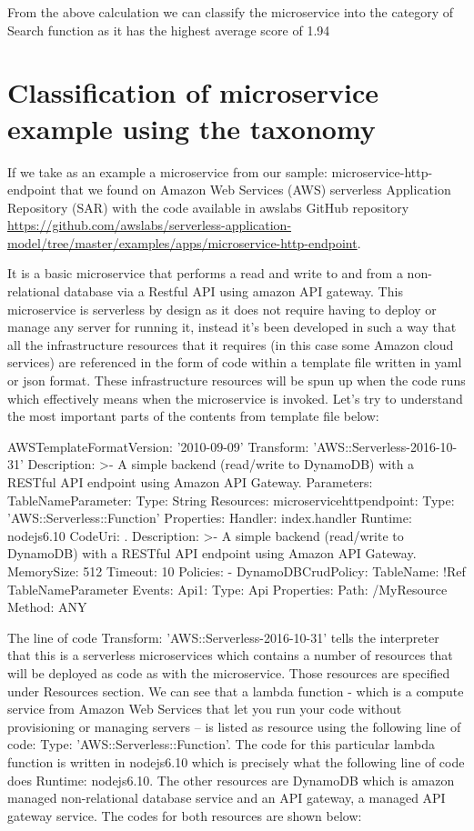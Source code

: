 \documentclass{article}
\begin{document}
From the above calculation we can classify the microservice into the category of Search function as it has the highest average score of 1.94

\section{Classification of microservice example using the taxonomy}

If we take as an example a microservice from our sample: microservice-http-endpoint that we found on Amazon Web Services (AWS) serverless Application Repository (SAR) with the code available in awslabs GitHub repository \url{https://github.com/awslabs/serverless-application-model/tree/master/examples/apps/microservice-http-endpoint}.

It is a basic microservice that performs a read and write to and from a non-relational database via a Restful API using amazon API gateway. This microservice is serverless by design as it does not require having to deploy or manage any server for running it, instead it’s been developed in such a way that all the infrastructure resources that it requires (in this case some Amazon cloud services) are referenced in the form of code within a template file written in yaml or json format. These infrastructure resources will be spun up when the code runs which effectively means when the microservice is invoked. Let’s try to understand the most important parts of the contents from template file below:

AWSTemplateFormatVersion: '2010-09-09'
Transform: 'AWS::Serverless-2016-10-31'
Description: >-
  A simple backend (read/write to DynamoDB) with a RESTful API endpoint using Amazon API Gateway.
Parameters: 
  TableNameParameter: 
    Type: String
Resources:
  microservicehttpendpoint:
    Type: 'AWS::Serverless::Function'
    Properties:
      Handler: index.handler
      Runtime: nodejs6.10
      CodeUri: .
      Description: >-
        A simple backend (read/write to DynamoDB) with a RESTful API endpoint using Amazon API Gateway.
      MemorySize: 512
      Timeout: 10
      Policies:
        - DynamoDBCrudPolicy:
            TableName: !Ref TableNameParameter
      Events:
        Api1:
          Type: Api
          Properties:
            Path: /MyResource
            Method: ANY

The line of code Transform: 'AWS::Serverless-2016-10-31' tells the interpreter that this is a serverless microservices which contains a number of resources that will be deployed as code as with the microservice. Those resources are specified under Resources section. We can see that a lambda function - which is a compute service from Amazon Web Services that let you run your code without provisioning or managing servers – is listed as resource using the following line of code:  
Type: 'AWS::Serverless::Function'. The code for this particular lambda function is written in nodejs6.10 which is precisely what the following line of code does Runtime: nodejs6.10. The other resources are DynamoDB which is amazon managed non-relational database service and an API gateway, a managed API gateway service. The codes for both resources are shown below:
\end{document}

